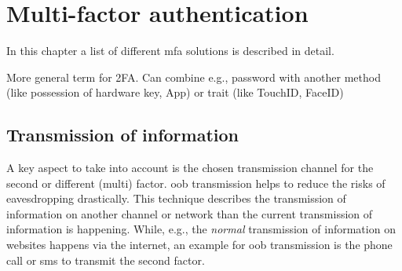 \chapter{Multi-factor authentication}

In this chapter a list of different \gls{mfa} solutions is described in detail.
\cite{9781849287333}

More general term for 2FA. Can combine e.g., password with another method (like possession of hardware key, App) or trait (like TouchID, FaceID)

\section{Transmission of information}

A key aspect to take into account is the chosen transmission channel for the second or different (multi) factor. \gls{oob} transmission helps to reduce the risks of eavesdropping drastically. This technique describes the transmission of information on another channel or network than the current transmission of information is happening. While, e.g., the \textit{normal} transmission of information on websites happens via the internet, an example for \gls{oob} transmission is the phone call or \gls{sms} to transmit the second factor. 